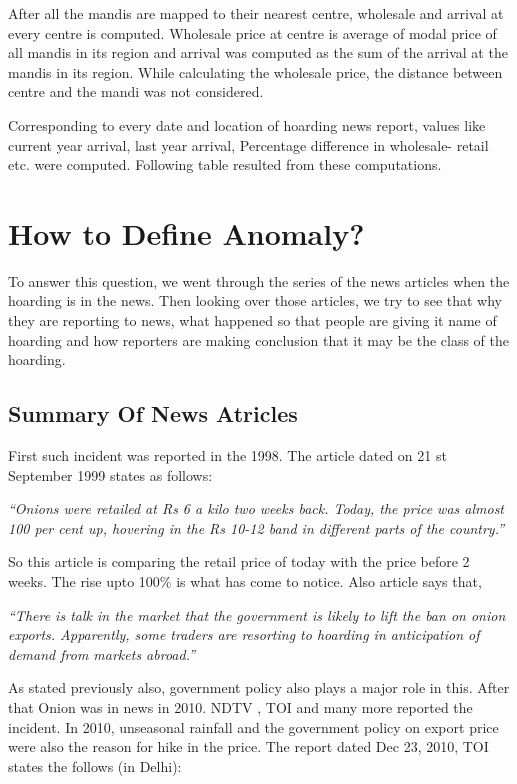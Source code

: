 After all the mandis are mapped to their nearest centre, wholesale and arrival at every centre is computed. Wholesale price at centre is average of modal price of all mandis in its region and arrival was computed as the sum of the arrival at the mandis in its region. While calculating the wholesale price, the distance between centre and the mandi was not considered.

Corresponding to every date and location of hoarding news report, values like current year arrival, last year arrival, Percentage difference in wholesale- retail etc. were computed. Following table resulted from these computations.


\section{How to Define Anomaly?}

To answer this question, we went through the series of the news articles when the hoarding is in the news. Then looking over those articles, we try to see that why they are reporting to news, what happened so that people are giving it name of hoarding and how reporters are making conclusion that it may be the class of the hoarding.

\subsection{Summary Of News Atricles}


First such incident was reported in the 1998. The article \cite{Redif57:online} dated on 21 st September 1999 states as follows:

\textit{ “Onions were retailed at Rs 6 a kilo two weeks back. Today, the price was almost 100 per cent up, hovering in the Rs 10-12 band in different parts of the country.” }

So this article is comparing the retail price of today with the price before 2 weeks. The rise upto 100\% is what has come to notice. Also article says that, 

\textit{“There is talk in the market that the government is likely to lift the ban on onion exports. Apparently, some traders are resorting to hoarding in anticipation of demand from markets abroad.”}

As stated previously also, government policy also plays a major role in this. After that Onion was in news in 2010. NDTV \cite{Whyo17:online}, TOI \cite{Theg44:online} and many more reported the incident. In 2010, unseasonal rainfall and the government policy on export price were also the reason for hike in the price. The report dated Dec 23, 2010, TOI states the follows (in Delhi):

